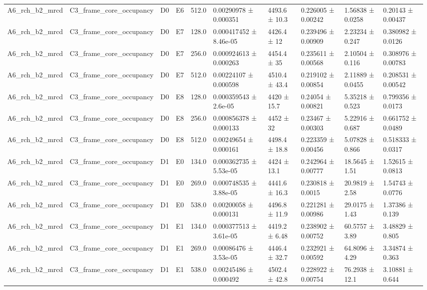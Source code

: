 \begin{table}
\begin{tabular}{llllllllll}
A6\_rch\_b2\_mrcd & C3\_frame\_core\_occupancy & D0 & E6 & 512.0 & 0.00290978 ± 0.000351 & 4493.6 ± 10.3 & 0.226005 ± 0.00242 & 1.56838 ± 0.0258 & 0.20143 ± 0.00437 \\
A6\_rch\_b2\_mrcd & C3\_frame\_core\_occupancy & D0 & E7 & 128.0 & 0.000417452 ± 8.46e-05 & 4426.4 ± 12 & 0.239496 ± 0.00909 & 2.23234 ± 0.247 & 0.380982 ± 0.0126 \\
A6\_rch\_b2\_mrcd & C3\_frame\_core\_occupancy & D0 & E7 & 256.0 & 0.000924613 ± 0.000263 & 4454.4 ± 35 & 0.235611 ± 0.00568 & 2.10504 ± 0.116 & 0.308976 ± 0.00783 \\
A6\_rch\_b2\_mrcd & C3\_frame\_core\_occupancy & D0 & E7 & 512.0 & 0.00224107 ± 0.000598 & 4510.4 ± 43.4 & 0.219102 ± 0.00854 & 2.11889 ± 0.0455 & 0.208531 ± 0.00542 \\
A6\_rch\_b2\_mrcd & C3\_frame\_core\_occupancy & D0 & E8 & 128.0 & 0.000359543 ± 2.6e-05 & 4420 ± 15.7 & 0.24054 ± 0.00821 & 5.35218 ± 0.523 & 0.799356 ± 0.0173 \\
A6\_rch\_b2\_mrcd & C3\_frame\_core\_occupancy & D0 & E8 & 256.0 & 0.000856378 ± 0.000133 & 4452 ± 32 & 0.23467 ± 0.00303 & 5.22916 ± 0.687 & 0.661752 ± 0.0489 \\
A6\_rch\_b2\_mrcd & C3\_frame\_core\_occupancy & D0 & E8 & 512.0 & 0.00249654 ± 0.000161 & 4498.4 ± 18.8 & 0.223359 ± 0.00456 & 5.07828 ± 0.866 & 0.518333 ± 0.0317 \\
A6\_rch\_b2\_mrcd & C3\_frame\_core\_occupancy & D1 & E0 & 134.0 & 0.000362735 ± 5.53e-05 & 4424 ± 13.1 & 0.242964 ± 0.00777 & 18.5645 ± 1.51 & 1.52615 ± 0.0813 \\
A6\_rch\_b2\_mrcd & C3\_frame\_core\_occupancy & D1 & E0 & 269.0 & 0.000748535 ± 3.88e-05 & 4441.6 ± 16.3 & 0.230818 ± 0.0015 & 20.9819 ± 2.58 & 1.54743 ± 0.0776 \\
A6\_rch\_b2\_mrcd & C3\_frame\_core\_occupancy & D1 & E0 & 538.0 & 0.00200058 ± 0.000131 & 4496.8 ± 11.9 & 0.221281 ± 0.00986 & 29.0175 ± 1.43 & 1.37386 ± 0.139 \\
A6\_rch\_b2\_mrcd & C3\_frame\_core\_occupancy & D1 & E1 & 134.0 & 0.000377513 ± 3.61e-05 & 4419.2 ± 6.48 & 0.238902 ± 0.00752 & 60.5757 ± 3.89 & 3.48829 ± 0.805 \\
A6\_rch\_b2\_mrcd & C3\_frame\_core\_occupancy & D1 & E1 & 269.0 & 0.00086476 ± 3.53e-05 & 4446.4 ± 32.7 & 0.232921 ± 0.00592 & 64.8096 ± 4.29 & 3.34874 ± 0.363 \\
A6\_rch\_b2\_mrcd & C3\_frame\_core\_occupancy & D1 & E1 & 538.0 & 0.00245486 ± 0.000492 & 4502.4 ± 42.8 & 0.228922 ± 0.00754 & 76.2938 ± 12.1 & 3.10881 ± 0.644 \\

\end{tabular}
\end{table}
